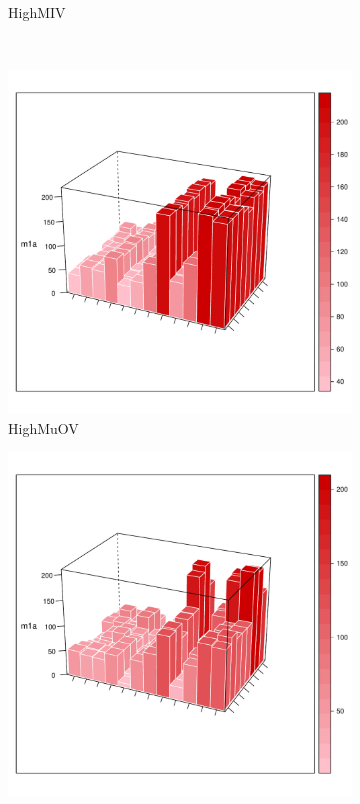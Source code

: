 \documentclass{article}
\begin{document}
\begin{figure}
\begin{subfigure}[b]{0.45\textwidth}
							\caption{HighMIV}
							\label{fig:HighMIV}
						\end{subfigure}
						\newline
						~ %
						\begin{subfigure}[b]{0.45\textwidth}
							\includegraphics[width=\textwidth]{High/MuOV.pdf}
							\caption{HighMuOV}
							\label{fig:HighMuOV}
						\end{subfigure}
						\begin{subfigure}[b]{0.45\textwidth}
							\includegraphics[width=\textwidth]{High/MCAR.pdf}

\end{subfigure}
\end{figure}
\end{document}
